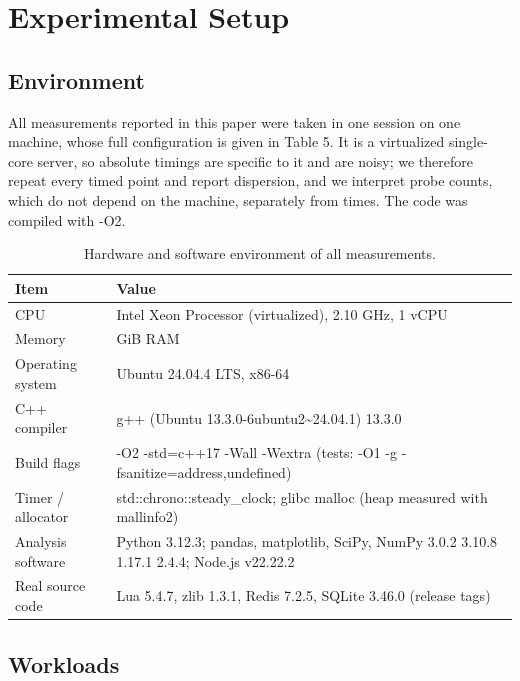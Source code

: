 \documentclass{ieeeaccess}
\begin{document}
\section{Experimental Setup}

\subsection{Environment}

All measurements reported in this paper were taken in one session on one machine, whose full configuration is given in Table 5. It is a virtualized single-core server, so absolute timings are specific to it and are noisy; we therefore repeat every timed point and report dispersion, and we interpret probe counts, which do not depend on the machine, separately from times. The code was compiled with -O2.

\begin{table}[!t]
\caption{Hardware and software environment of all measurements.}
\label{tab:5}
\centering
\scriptsize
\setlength{\tabcolsep}{3pt}
\begin{tabular}{|>{\raggedright\arraybackslash}p{}|>{\raggedright\arraybackslash}p{}|}
\hline
\textbf{Item} & \textbf{Value} \\
\hline
CPU & Intel Xeon Processor (virtualized), 2.10 GHz, 1 vCPU \\
Memory & 3.9 GiB RAM \\
Operating system & Ubuntu 24.04.4 LTS, x86-64 \\
C++ compiler & g++ (Ubuntu 13.3.0-6ubuntu2\textasciitilde{}24.04.1) 13.3.0 \\
Build flags & -O2 -std=c++17 -Wall -Wextra (tests: -O1 -g -fsanitize=address,undefined) \\
Timer / allocator & std::chrono::steady\_clock; glibc malloc (heap measured with mallinfo2) \\
Analysis software & Python 3.12.3; pandas, matplotlib, SciPy, NumPy 3.0.2 3.10.8 1.17.1 2.4.4; Node.js v22.22.2 \\
Real source code & Lua 5.4.7, zlib 1.3.1, Redis 7.2.5, SQLite 3.46.0 (release tags) \\
\hline
\end{tabular}
\end{table}


\subsection{Workloads}
\end{document}
